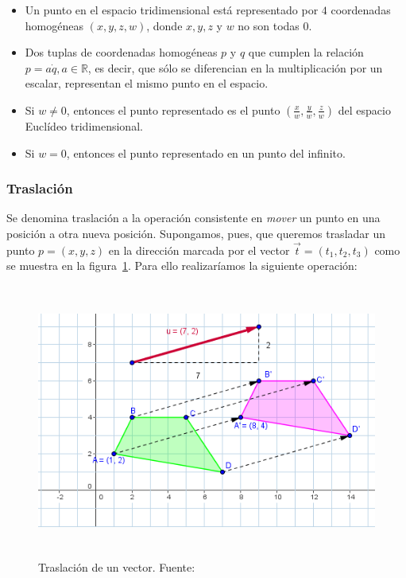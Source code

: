 \begin{itemize}

		\item Un punto en el espacio tridimensional está representado por $4$
				coordenadas homogéneas $(x,y,z,w)$, donde $x,y,z$ y $w$ no son
				todas $0$.

		\item Dos tuplas de coordenadas homogéneas $p$ y $q$ que cumplen la
				relación $p = a \dot q, a \in \mathbb{R}$, es decir, que sólo se
				diferencian en la multiplicación por un escalar, representan el
				mismo punto en el espacio.

		\item Si $w \neq 0$, entonces el punto representado es el punto
				$(\frac{x}{w},\frac{y}{w},\frac{z}{w})$ del espacio Euclídeo
				tridimensional.

		\item Si $w = 0$, entonces el punto representado en un punto del
				infinito.

\end{itemize}

\subsubsection{Traslación}
\label{makereference5.4.1.1}

Se denomina traslación a la operación consistente en \textit{mover} un punto en
una posición a otra nueva posición. Supongamos, pues, que queremos trasladar un
punto $p = (x,y,z)$ en la dirección marcada por el vector
$\overrightarrow{t} = (t_1, t_2, t_3)$ como se muestra en la
figura~\ref{fig:traslation}. Para ello realizaríamos la siguiente operación:

\begin{figure}
	\centering	
	\includegraphics[height=9cm]{figures/traslacion.png}
	\caption[Traslación de un vector.]{Traslación de un vector.
	Fuente:~\cite{vectortraslationimage}}
	\label{fig:traslation}
\end{figure}

